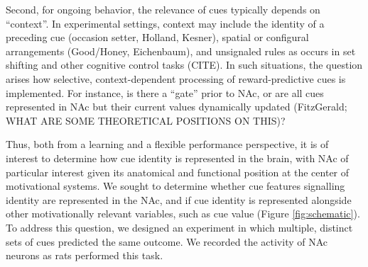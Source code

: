 \documentclass[11pt]{article}
\begin{document}
Second, for ongoing behavior, the relevance of cues typically depends on “context”. In experimental settings, context may include the identity of a preceding cue (occasion setter, Holland, Kesner), spatial or configural arrangements (Good/Honey, Eichenbaum), and unsignaled rules as occurs in set shifting and other cognitive control tasks (CITE). In such situations, the question arises how selective, context-dependent processing of reward-predictive cues is implemented. For instance, is there a “gate” prior to NAc, or are all cues represented in NAc but their current values dynamically updated (FitzGerald; WHAT ARE SOME THEORETICAL POSITIONS ON THIS)? 

Thus, both from a learning and a flexible performance perspective, it is of interest to determine how cue identity is represented in the brain, with NAc of particular interest given its anatomical and functional position at the center of motivational systems. We sought to determine whether cue features signalling identity are represented in the NAc, and if cue identity is represented alongside other motivationally relevant variables, such as cue value (Figure \ref{fig:schematic}). To address this question, we designed an experiment in which multiple, distinct sets of cues predicted the same outcome. We recorded the activity of NAc neurons as rats performed this task. 
\end{document}
